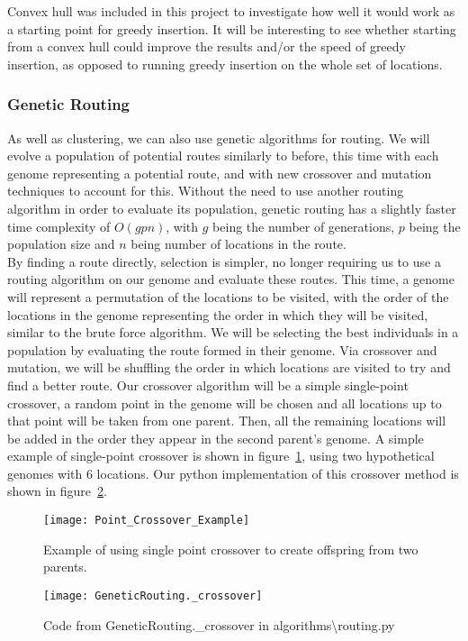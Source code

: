 \noindent
Convex hull was included in this project to investigate how well it would work as a starting point for greedy
insertion.
It will be interesting to see whether starting from a convex hull could improve the results and/or the speed of
greedy insertion, as opposed to running greedy insertion on the whole set of locations.

\subsubsection{Genetic Routing}\label{subsubsec:genetic-routing}
As well as clustering, we can also use genetic algorithms for routing.
We will evolve a population of potential routes similarly to before, this time with each genome representing a
potential route, and with new crossover and mutation techniques to account for this.
Without the need to use another routing algorithm in order to evaluate its population, genetic routing has a
slightly faster time complexity of $O(g p n)$, with $g$ being the number of generations, $p$ being the population
size and $n$ being number of locations in the route.\\

\noindent
By finding a route directly, selection is simpler, no longer requiring us to use a routing algorithm on our genome
and evaluate these routes.
This time, a genome will represent a permutation of the locations to be visited, with the order of the locations in the
genome representing the order in which they will be visited, similar to the brute force algorithm.
We will be selecting the best individuals in a population by evaluating the route formed in their genome.
Via crossover and mutation, we will be shuffling the order in which locations are visited to try and find a better
route.
Our crossover algorithm will be a simple single-point crossover, a random point in the genome will be chosen and all
locations up to that point will be taken from one parent.
Then, all the remaining locations will be added in the order they appear in the second parent's genome.
A simple example of single-point crossover is shown in figure~\ref{fig:Point_Crossover_Example}, using two
hypothetical genomes with 6 locations.
Our python implementation of this crossover method is shown in figure~\ref{fig:GeneticRouting._crossover}.
\begin{figure}[H]
    \centering
    \texttt{[image: Point\_Crossover\_Example]}
    \caption{Example of using single point crossover to create offspring from two parents.}
    \label{fig:Point_Crossover_Example}
\end{figure}
\begin{figure}[H]
    \centering
    \texttt{[image: GeneticRouting.\_crossover]}
    \caption{Code from GeneticRouting.\_crossover in algorithms\textbackslash routing.py}
    \label{fig:GeneticRouting._crossover}
\end{figure}

